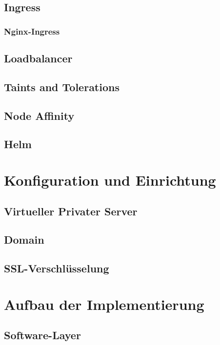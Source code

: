 \subsection{Ingress}
\subsubsection{Nginx-Ingress}
\subsection{Loadbalancer}
\subsection{Taints and Tolerations}
\subsection{Node Affinity}
\subsection{Helm}

\section{Konfiguration und Einrichtung}
\subsection{Virtueller Privater Server}
\subsection{Domain}
\subsection{SSL-Verschlüsselung}

\section{Aufbau der Implementierung}
\subsection{Software-Layer}